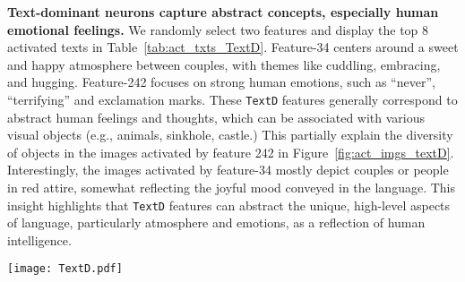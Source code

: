 \textbf{Text-dominant neurons capture abstract concepts, especially human emotional feelings.} We randomly select two features and display the top 8 activated texts in Table~\ref{tab:act_txts_TextD}. Feature-34 centers around a sweet and happy atmosphere between couples, with themes like cuddling, embracing, and hugging. Feature-242 focuses on strong human emotions, such as ``never'', ``terrifying'' and exclamation marks. These \texttt{TextD} features generally correspond to abstract human feelings and thoughts, which can be associated with various visual objects (e.g., animals, sinkhole, castle.) This partially explain the diversity of objects in the images activated by feature 242 in Figure~\ref{fig:act_imgs_textD}. Interestingly, the images activated by feature-34 mostly depict couples or people in red attire, somewhat reflecting the joyful mood conveyed in the language. This insight highlights that \texttt{TextD} features can abstract the unique, high-level aspects of language, particularly atmosphere and emotions, as a reflection of human intelligence.

\begin{figure*}
\centering
\texttt{[image: TextD.pdf]}
\label{fig:act_imgs_textD}
\vfill
\hspace{2mm}
    \label{tab:act_txts_TextD}
\end{figure*}

